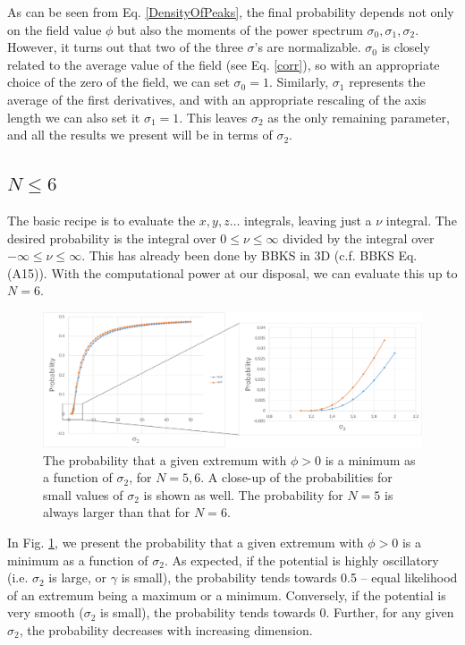 \documentclass[12pt]{article}
\begin{document}
As can be seen from Eq. \ref{DensityOfPeaks}, the final probability depends not only on the field value $\phi$ but also the moments of the power spectrum $\sigma_0, \sigma_1, \sigma_2$. However, it turns out that two of the three $\sigma$'s are normalizable. $\sigma_0$ is closely related to the average value of the field (see Eq. \ref{corr}), so with an appropriate choice of the zero of the field, we can set $\sigma_0 = 1$. Similarly, $\sigma_1$ represents the average of the first derivatives, and with an appropriate rescaling of the axis length we can also set it $\sigma_1 = 1$. This leaves $\sigma_2$ as the only remaining parameter, and all the results we present will be in terms of $\sigma_2$.

\subsection{$N \leq 6$}
The basic recipe is to evaluate the $x, y, z \ldots$ integrals, leaving just a $\nu$ integral. The desired probability is the integral over $0 \leq \nu \leq \infty$ divided by the integral over $-\infty \leq \nu \leq \infty$. This has already been done by BBKS in 3D (c.f. BBKS Eq. (A15)). With the computational power at our disposal, we can evaluate this up to $N=6$.

\begin{figure}
  \centering
  \includegraphics[width=\linewidth]{N6minima.png}
  \caption{The probability that a given extremum with $\phi > 0$ is a minimum as a function of $\sigma_2$, for $N=5,6$. A close-up of the probabilities for small values of $\sigma_2$ is shown as well. The probability for $N=5$ is always larger than that for $N=6$.}
  \label{N6}
\end{figure}

In Fig. \ref{N6}, we present the probability that a given extremum with $\phi > 0$ is a minimum as a function of $\sigma_2$. As expected, if the potential is highly oscillatory (i.e. $\sigma_2$ is large, or $\gamma$ is small), the probability tends towards 0.5 -- equal likelihood of an extremum being a maximum or a minimum. Conversely, if the potential is very smooth ($\sigma_2$ is small), the probability tends towards 0. Further, for any given $\sigma_2$, the probability decreases with increasing dimension.
\end{document}
